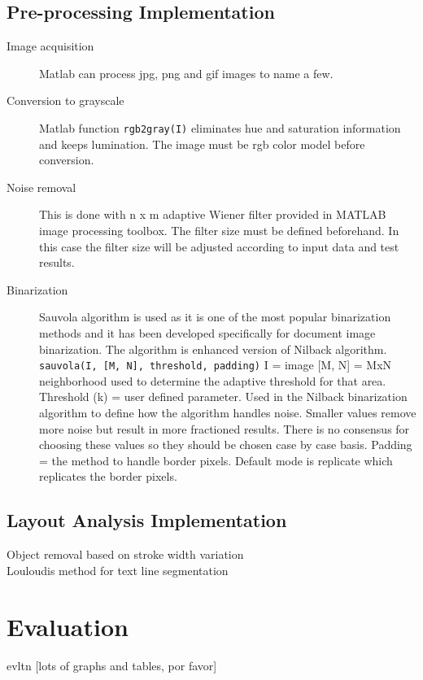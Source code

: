 \documentclass{article}
\def\code#1{\texttt{#1}}
\begin{document}
    \subsection{Pre-processing Implementation}
      \begin{description}
        \item [Image acquisition] Matlab can process jpg, png and gif images to name a few.
        \item [Conversion to grayscale] Matlab function \code{rgb2gray(I)} eliminates hue and saturation information and keeps lumination. The image must be rgb color model before conversion.
        \item [Noise removal] This is done with n x m adaptive Wiener filter provided in MATLAB image processing toolbox. The filter size must be defined beforehand. In this case the filter size will be adjusted according to input data and test results.
        \item [Binarization] Sauvola algorithm is used as it is one of the most popular binarization methods and it has been developed specifically for document image binarization. The algorithm is enhanced version of Nilback algorithm.
        \code{sauvola(I, [M, N], threshold, padding)}
        I = image
        [M, N] = MxN neighborhood used to determine the adaptive threshold for that area.
        Threshold (k) = user defined parameter. Used in the Nilback binarization algorithm to define how the algorithm handles noise. Smaller values remove more noise but result in more fractioned results. There is no consensus for choosing these values so they should be chosen case by case basis.
        Padding = the method to handle border pixels. Default mode is replicate which replicates the border pixels.
      \end{description}

      \subsection{Layout Analysis Implementation}
        \begin{description}
          \item [Object removal based on stroke width variation]
          \item [Louloudis method for text line segmentation]
        \end{description}
  \newpage
  \section{Evaluation}
  evltn [lots of graphs and tables, por favor]

  \newpage
  
  
\end{document}
